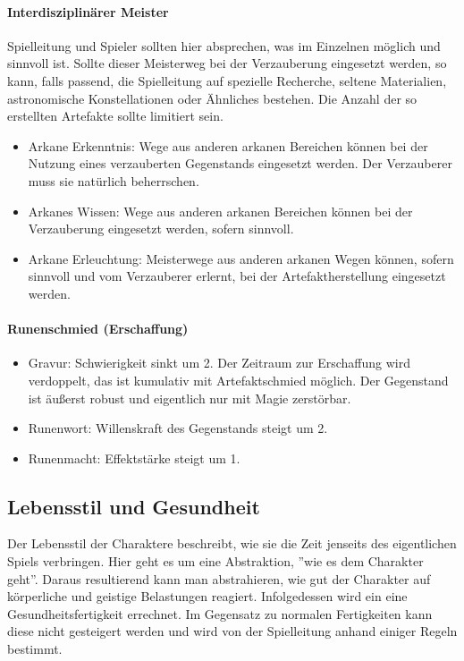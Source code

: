 \documentclass{article}
\begin{document}
\paragraph{Interdisziplinärer Meister}

Spielleitung und Spieler sollten hier absprechen, was im Einzelnen möglich und sinnvoll ist. Sollte dieser Meisterweg
bei der Verzauberung eingesetzt werden, so kann, falls passend, die Spielleitung auf spezielle Recherche, seltene
Materialien, astronomische Konstellationen oder Ähnliches bestehen. Die Anzahl der so erstellten Artefakte sollte
limitiert sein.

\begin{itemize}
\item Arkane Erkenntnis: Wege aus anderen arkanen Bereichen können bei der Nutzung eines verzauberten Gegenstands eingesetzt werden. Der Verzauberer muss sie natürlich beherrschen.
\item Arkanes Wissen: Wege aus anderen arkanen Bereichen können bei der Verzauberung eingesetzt werden, sofern sinnvoll.
\item Arkane Erleuchtung: Meisterwege aus anderen arkanen Wegen können, sofern sinnvoll und vom Verzauberer erlernt, bei der Artefaktherstellung eingesetzt werden.
\end{itemize}

\paragraph{Runenschmied (Erschaffung)}

\begin{itemize}
\item Gravur: Schwierigkeit sinkt um 2. Der Zeitraum zur Erschaffung wird verdoppelt, das ist kumulativ mit Artefaktschmied möglich. Der Gegenstand ist äußerst robust und eigentlich nur mit Magie zerstörbar.
\item Runenwort: Willenskraft des Gegenstands steigt um 2.
\item Runenmacht: Effektstärke steigt um 1.
\end{itemize}

\begin{center}
\section{Lebensstil und Gesundheit}
\end{center}

Der Lebensstil der Charaktere beschreibt, wie sie die Zeit jenseits des eigentlichen Spiels verbringen. Hier geht es um
eine Abstraktion, ''wie es dem Charakter geht''. Daraus resultierend kann man abstrahieren, wie gut der Charakter auf
körperliche und geistige Belastungen reagiert. Infolgedessen wird ein eine Gesundheitsfertigkeit errechnet. Im Gegensatz
zu normalen Fertigkeiten kann diese nicht gesteigert werden und wird von der Spielleitung anhand einiger Regeln bestimmt.
\end{document}
